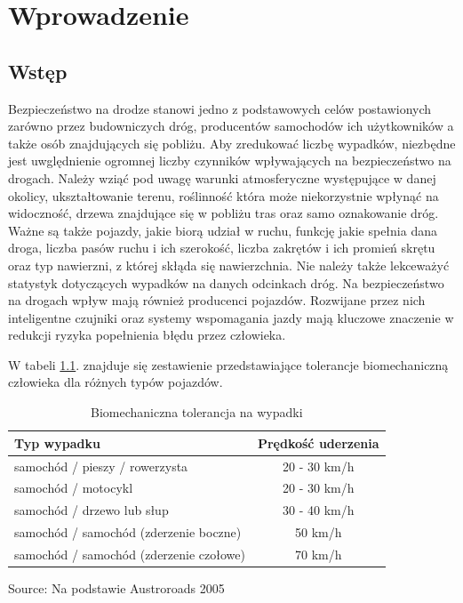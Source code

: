 \chapter{Wprowadzenie}
\label{cha:wprowadzenie}


\section{Wstęp}
\label{sec:wstep}

Bezpieczeństwo na drodze stanowi jedno z podstawowych celów postawionych zarówno przez budowniczych dróg, producentów samochodów ich użytkowników a także osób znajdujących się pobliżu. Aby zredukować liczbę wypadków, niezbędne jest uwględnienie ogromnej liczby czynników wpływających na bezpieczeństwo na drogach. Należy wziąć pod uwagę warunki atmosferyczne występujące w danej okolicy, ukształtowanie terenu, roślinność która może niekorzystnie wpłynąć na widoczność, drzewa znajdujące się w pobliżu tras oraz samo oznakowanie dróg. Ważne są także pojazdy, jakie biorą udział w ruchu, funkcję jakie spełnia dana droga, liczba pasów ruchu i ich szerokość, liczba zakrętów i ich promień skrętu oraz typ nawierzni, z której skłąda się nawierzchnia. Nie należy także lekceważyć statystyk dotyczących wypadków na danych odcinkach dróg. Na bezpieczeństwo na drogach wpływ mają również producenci pojazdów. Rozwijane przez nich inteligentne czujniki oraz systemy wspomagania jazdy mają kluczowe znaczenie w redukcji ryzyka popełnienia błędu przez człowieka.

W tabeli \ref{BiomechanicznaToleracja}. znajduje się zestawienie przedstawiające tolerancje biomechaniczną człowieka dla różnych typów pojazdów.

\newcommand{\source}[1]{\caption*{Source: {#1}} }

\begin{table}[ht]
\centering
\caption{Biomechaniczna tolerancja na wypadki}
\label{BiomechanicznaToleracja}
\begin{tabular}{| l | c |}
\hline
\textbf{Typ wypadku}                    & \textbf{Prędkość uderzenia} \\ \hline
samochód / pieszy / rowerzysta          & 20 - 30 km/h                                    \\ \hline
samochód / motocykl                     & 20 - 30 km/h                                    \\ \hline
samochód / drzewo lub słup              & 30 - 40 km/h                                    \\ \hline
samochód / samochód (zderzenie boczne)  & 50 km/h                                         \\ \hline
samochód / samochód (zderzenie czołowe) & 70 km/h   \\ \hline
\end{tabular}
\source{Na podstawie Austroroads 2005}
\end{table}

